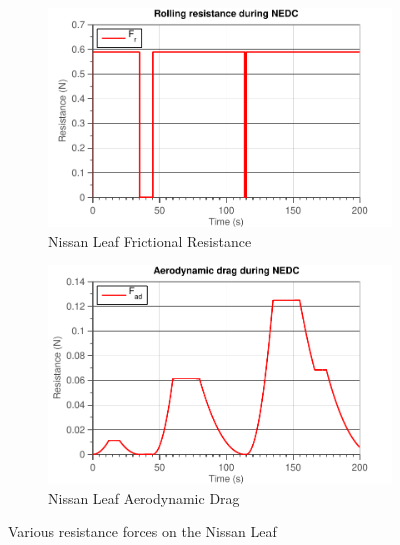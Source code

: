 \documentclass[11pt,titlepage]{report}
\begin{document}
\begin{enumerate}
\begin{itemize}
		\begin{figure}[H]
			\begin{center}
				\begin{subfigure}[h]{0.49\textwidth}
					\includegraphics[width=\textwidth]{resource/kitt/resistance-friction-rc.pdf}
					\caption{Nissan Leaf Frictional Resistance}
					\label{fig:ass4-t1-resistance-friction-kitt}
				\end{subfigure}
				\enspace
				\begin{subfigure}[h]{0.49\textwidth}
					\includegraphics[width=\textwidth]{resource/kitt/resistance-aero-rc.pdf}
					\caption{Nissan Leaf Aerodynamic Drag}
					\label{fig:ass4-t1-resistance-aero-kitt}
				\end{subfigure}
			\end{center}
			\caption{Various resistance forces on the Nissan Leaf}
			\label{fig:ass4-t1-resistance-kitt}
		\end{figure}


\end{itemize}
\end{enumerate}
\end{document}
